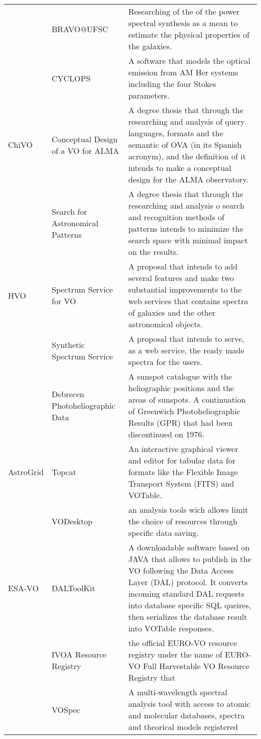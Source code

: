 \begin{table*}[h!t]
\begin{tabular}{|l|l|p{12.5cm}|}
			& BRAVO@UFSC & Researching of the of the power spectral synthesis as a mean to estimate the physical properties of the galaxies.\\
			& CYCLOPS & A software that models the optical emission from AM Her systems including the four Stokes parameters.\\
	\hline
	ChiVO	& Conceptual Design of a VO for ALMA & A degree thesis that through the researching and analysis of 
									query languages, formats and the semantic of OVA (in its Spanish acronym), and the definition of it intends to make a conceptual design for the ALMA 
									observatory.\\
			& Search for Astronomical Patterns & A degree thesis that through 
									the researching and analysis o search and recognition methods of 
									patterns intends to minimize the search space with minimal impact on the 
									results. \\
	\hline								
	HVO		& Spectrum Service for VO & A proposal that intends to add several features and make two substantial improvements to the web services that 
									contains spectra of galaxies and the other astronomical objects.\\
			& Synthetic Spectrum Service & A proposal that intends to serve, as a web service, the ready made spectra for the users.\\
			& Debrecen Photoheliographic Data & A sunspot catalogue with the heliographic positions and the areas of sunspots. A continuation of Greenwich 
									Photoheliographic Results (GPR) that had been discontinued on 1976.\\
	\hline								
	AstroGrid& Topcat & An interactive graphical viewer and editor for tabular data for formats like the Flexible Image Transport System (FITS) 
									and VOTable. \\
			& VODesktop & an analysis tools wich allows limit the choice of resources through specific data saving.\\
	\hline		
	ESA-VO	& DALToolKit & A downloadable software based on JAVA that allows to publish in the VO following the Data Access Layer (DAL) protocol. It 
									converts incoming standard DAL requests into database specific SQL queires, then serializes the database result into VOTable 
									responses. \\
			& IVOA Resource Registry & the official EURO-VO resource registry under the name of EURO-VO Full Harvestable VO Resource Registry that \\
			& VOSpec & A multi-wavelength spectral analysis tool with access to atomic and molecular databases, spectra and theorical models registered 

\end{tabular}
\end{table*}
